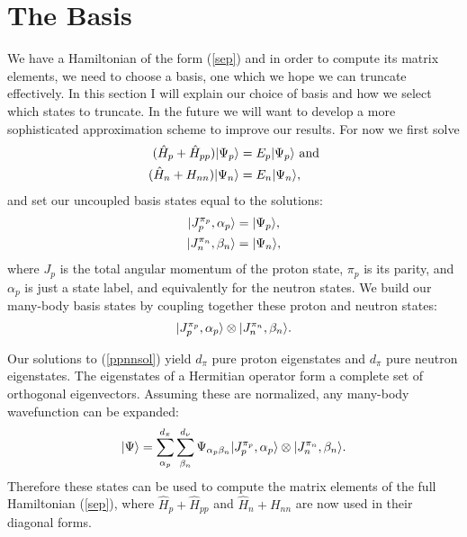 \section{The Basis}
We have a Hamiltonian of the form (\ref{sep}) and in order to compute its matrix
elements, we need to choose a basis, one which we hope we can truncate effectively. In this
section I will explain our choice of basis and how we select which states to truncate.
In the future we will want to develop a more sophisticated approximation scheme to 
improve our results. 
For now we first solve
\begin{equation}\begin{split}\label{ppnnsol}
    (\hat{H}_p + \hat{H}_{pp})|\Psi_p\rangle&= E_p|\Psi_p\rangle \textrm{ and}\\
    (\hat{H}_n+H_{nn})|\Psi_n\rangle&=E_n|\Psi_n\rangle,
\end{split}\end{equation}
and set our uncoupled basis states equal to the solutions:
\begin{equation}\begin{split}\label{plusminus}
    |J_p^{\pi_p},\alpha_p\rangle&=|\Psi_p\rangle,\\
    |J_n^{\pi_n},\beta_n\rangle&=|\Psi_n\rangle,
\end{split}\end{equation}
where $J_p$ is the total angular momentum of the proton state, $\pi_p$ is its parity,
and $\alpha_p$ is just a state label, and equivalently for the neutron states. 
We build our many-body basis states by coupling together these proton and
neutron states: 
\begin{equation}\label{cbasis}
	|J_p^{\pi_p},\alpha_p\rangle\otimes|J_n^{\pi_n},\beta_n\rangle.
\end{equation}

Our
solutions to (\ref{ppnnsol}) yield $d_\pi$ pure proton eigenstates and $d_\pi$ pure
neutron eigenstates. The eigenstates of a Hermitian operator form a complete set 
of orthogonal eigenvectors. Assuming these are normalized, any many-body 
wavefunction can be expanded:
\begin{equation}
    |\Psi\rangle = \sum_{\alpha_p}^{d_\pi}\sum_{\beta_n}^{d_\nu}\Psi_{\alpha_p\beta_n} |J_p^{\pi_p},\alpha_p\rangle\otimes|J_n^{\pi_n},\beta_n\rangle.
\end{equation}
Therefore these states can be used to compute the matrix elements of the full Hamiltonian
(\ref{sep}), where $\hat{H}_p + \hat{H}_{pp}$ and $\hat{H}_n+H_{nn}$ are now
used in their diagonal forms.

